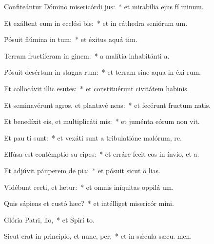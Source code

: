 \item Confiteántur Dómino misericórdi jus:~* et mirabília ejus fí minum.
\item Et exáltent eum in ecclési bis:~* et in cáthedra seniórum  um.
\item Pósuit flúmina in tum:~* et éxitus aquá  tim.
\item Terram fructíferam in ginem:~* a malítia inhabitánti  a.
\item Pósuit desértum in stagna rum:~* et terram sine aqua in éxi rum.
\item Et collocávit illic esutes:~* et constituérunt civitátem habinis.
\item Et seminavérunt agros, et plantavé neas:~* et fecérunt fructum natis.
\item Et benedíxit eis, et multiplicáti  mis:~* et juménta eórum non vit.
\item Et pau ti sunt:~* et vexáti sunt a tribulatióne malórum,  re.
\item Effúsa est contémptio su cipes:~* et erráre fecit eos in ínvio, et   a.
\item Et adjúvit páuperem de pia:~* et pósuit sicut o lias.
\item Vidébunt recti, et lætur:~* et omnis iníquitas oppilá  um.
\item Quis sápiens et custó hæc?~* et intélliget misericór mini.
\item Glória Patri,  lio,~* et Spirí to.
\item Sicut erat in princípio, et nunc,  per,~* et in sǽcula sæcu. men.
